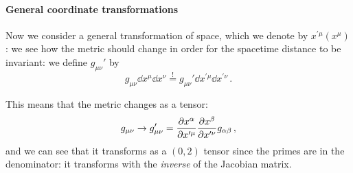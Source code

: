 \documentclass[main.tex]{subfiles}
\begin{document}
\paragraph{General coordinate transformations}

Now we consider a general transformation of space, which we denote by \(x^{\prime \mu } (x^{\mu })\): we see how the metric should change in order for the spacetime distance to be invariant: we define \(g_{\mu \nu }'\) by 
%
\begin{equation}
    g_{\mu \nu } \dd{x^{\mu }} \dd{x^{\nu }}
    \overset{!}{=}  
    g_{\mu \nu }' \dd{x^{\prime \mu }} \dd{x^{\prime \nu }}
\,.
\end{equation}
%

This means that the metric changes as a tensor: 
%
\begin{equation}
  g_{\mu \nu } \rightarrow
  g_{\mu \nu }' = 
  \pdv{x^{ \alpha }}{x^{\prime \mu }} 
  \pdv{x^{ \beta  }}{x^{\prime \nu  }} 
  g_{\alpha \beta }
\,,
\end{equation}
%
and we can see that it transforms as a \((0,2)\) tensor since the primes are in the denominator: it transforms with the \emph{inverse} of the Jacobian matrix.
\end{document}
